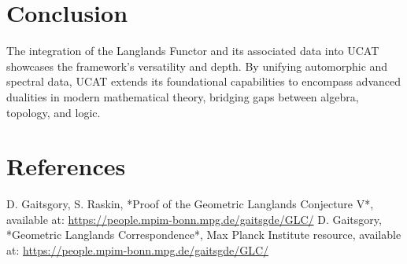 \documentclass{article}
\begin{document}
\section{Conclusion}

The integration of the Langlands Functor and its associated data into UCAT showcases the framework’s versatility and depth. By unifying automorphic and spectral data, UCAT extends its foundational capabilities to encompass advanced dualities in modern mathematical theory, bridging gaps between algebra, topology, and logic.

\section*{References}

\begin{thebibliography}{9}
 D. Gaitsgory, S. Raskin, *Proof of the Geometric Langlands Conjecture V*, available at: \url{https://people.mpim-bonn.mpg.de/gaitsgde/GLC/}
 D. Gaitsgory, *Geometric Langlands Correspondence*, Max Planck Institute resource, available at: \url{https://people.mpim-bonn.mpg.de/gaitsgde/GLC/}
\end{thebibliography}
\end{document}
